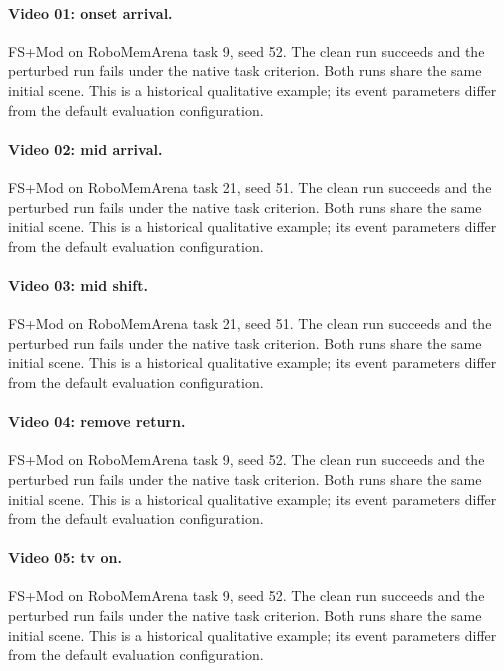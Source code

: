 \paragraph{Video 01: onset arrival.} FS+Mod on RoboMemArena task 9, seed 52. The clean run succeeds and the perturbed run fails under the native task criterion. Both runs share the same initial scene. This is a historical qualitative example; its event parameters differ from the default evaluation configuration.

\paragraph{Video 02: mid arrival.} FS+Mod on RoboMemArena task 21, seed 51. The clean run succeeds and the perturbed run fails under the native task criterion. Both runs share the same initial scene. This is a historical qualitative example; its event parameters differ from the default evaluation configuration.

\paragraph{Video 03: mid shift.} FS+Mod on RoboMemArena task 21, seed 51. The clean run succeeds and the perturbed run fails under the native task criterion. Both runs share the same initial scene. This is a historical qualitative example; its event parameters differ from the default evaluation configuration.

\paragraph{Video 04: remove return.} FS+Mod on RoboMemArena task 9, seed 52. The clean run succeeds and the perturbed run fails under the native task criterion. Both runs share the same initial scene. This is a historical qualitative example; its event parameters differ from the default evaluation configuration.

\paragraph{Video 05: tv on.} FS+Mod on RoboMemArena task 9, seed 52. The clean run succeeds and the perturbed run fails under the native task criterion. Both runs share the same initial scene. This is a historical qualitative example; its event parameters differ from the default evaluation configuration.


